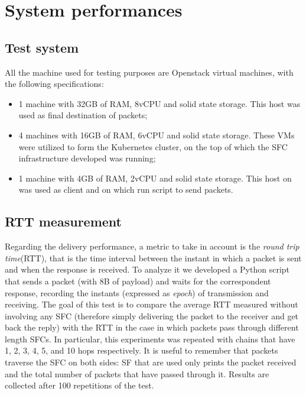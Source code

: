 \section{System performances}

\subsection{Test system}
All the machine used for testing purposes are Openstack virtual machines, with
the following specifications:
\begin{itemize}
\item 1 machine with 32GB of RAM, 8vCPU and solid state storage. This host was
used as final destination of packets;
\item 4 machines with 16GB of RAM, 6vCPU and solid state storage. These VMs
were utilized to form the Kubernetes cluster, on the top of which the SFC
infrastructure developed was running;
\item 1 machine with 4GB of RAM, 2vCPU and solid state storage. This host on
was used as client and on which run script to send packets.
\end{itemize}

\subsection{RTT measurement}
Regarding the delivery performance, a metric to take in account is the
\emph{round trip time}(RTT), that is the time interval between the instant in
which a packet is sent and when the response is received. To analyze it we
developed a Python script that sends a packet (with 8B of payload) and waits for
the correspondent response, recording the instants (expressed as \emph{epoch})
of transmission and receiving. The goal of this test is to compare the average
RTT measured without involving any SFC (therefore simply delivering the packet
to the receiver and get back the reply) with the RTT in the case in which
packets pass through different length SFCs. In particular, this experiments was
repeated with chains that have 1, 2, 3, 4, 5, and 10 hops respectively. It is
useful to remember that packets traverse the SFC on both sides: SF that are
used only prints the packet received and the total number of packets that have
passed through it. Results are collected after 100 repetitions of the test.

